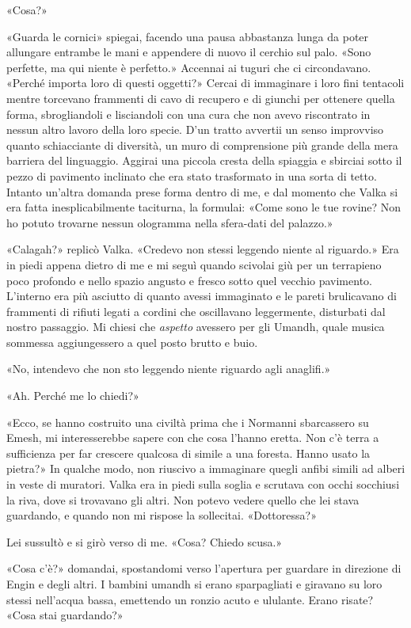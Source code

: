 «Cosa?»

«Guarda le cornici» spiegai, facendo una pausa abbastanza lunga da poter
allungare entrambe le mani e appendere di nuovo il cerchio sul palo.
«Sono perfette, ma qui niente è perfetto.» Accennai ai tuguri che ci
circondavano. «Perché importa loro di questi oggetti?» Cercai di
immaginare i loro fini tentacoli mentre torcevano frammenti di cavo di
recupero e di giunchi per ottenere quella forma, sbrogliandoli e
lisciandoli con una cura che non avevo riscontrato in nessun altro
lavoro della loro specie. D'un tratto avvertii un senso improvviso
quanto schiacciante di diversità, un muro di comprensione più grande
della mera barriera del linguaggio. Aggirai una piccola cresta della
spiaggia e sbirciai sotto il pezzo di pavimento inclinato che era stato
trasformato in una sorta di tetto. Intanto un'altra domanda prese forma
dentro di me, e dal momento che Valka si era fatta inesplicabilmente
taciturna, la formulai: «Come sono le tue rovine? Non ho potuto trovarne
nessun ologramma nella sfera-dati del palazzo.»

«Calagah?» replicò Valka. «Credevo non stessi leggendo niente al
riguardo.» Era in piedi appena dietro di me e mi seguì quando scivolai
giù per un terrapieno poco profondo e nello spazio angusto e fresco
sotto quel vecchio pavimento. L'interno era più asciutto di quanto
avessi immaginato e le pareti brulicavano di frammenti di rifiuti legati
a cordini che oscillavano leggermente, disturbati dal nostro passaggio.
Mi chiesi che \emph{aspetto} avessero per gli Umandh, quale musica
sommessa aggiungessero a quel posto brutto e buio.

«No, intendevo che non sto leggendo niente riguardo agli anaglifi.»

«Ah. Perché me lo chiedi?»

«Ecco, se hanno costruito una civiltà prima che i Normanni sbarcassero
su Emesh, mi interesserebbe sapere con che cosa l'hanno eretta. Non c'è
terra a sufficienza per far crescere qualcosa di simile a una foresta.
Hanno usato la pietra?» In qualche modo, non riuscivo a immaginare
quegli anfibi simili ad alberi in veste di muratori. Valka era in piedi
sulla soglia e scrutava con occhi socchiusi la riva, dove si trovavano
gli altri. Non potevo vedere quello che lei stava guardando, e quando
non mi rispose la sollecitai. «Dottoressa?»

Lei sussultò e si girò verso di me. «Cosa? Chiedo scusa.»

«Cosa c'è?» domandai, spostandomi verso l'apertura per guardare in
direzione di Engin e degli altri. I bambini umandh si erano sparpagliati
e giravano su loro stessi nell'acqua bassa, emettendo un ronzio acuto e
ululante. Erano risate? «Cosa stai guardando?»


